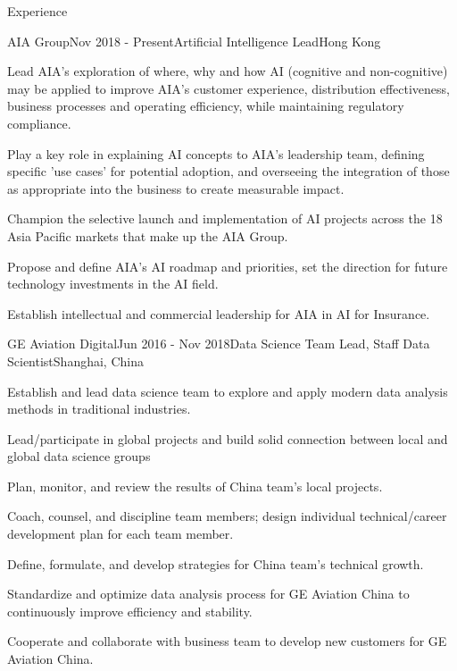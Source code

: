 \documentclass{resume} %
\begin{document}
\begin{rSection}{Experience}

\begin{rSubsection}{AIA Group}{Nov 2018 - Present}{Artificial Intelligence Lead}{Hong Kong}
\item Lead AIA's exploration of where, why and how AI (cognitive and non-cognitive) may be applied to improve AIA's customer experience, distribution effectiveness, business processes and operating efficiency, while maintaining regulatory compliance.
\item Play a key role in explaining AI concepts to AIA's leadership team, defining specific 'use cases' for potential adoption, and overseeing the integration of those as appropriate into the business to create measurable impact.
\item Champion the selective launch and implementation of AI projects across the 18 Asia Pacific markets that make up the AIA Group.
\item Propose and define AIA's AI roadmap and priorities, set the direction for future technology investments in the AI field.
\item Establish intellectual and commercial leadership for AIA in AI for Insurance.
\end{rSubsection}


\begin{rSubsection}{GE Aviation Digital}{Jun 2016 - Nov 2018}{Data Science Team Lead, Staff Data Scientist}{Shanghai, China}
\item Establish and lead data science team to explore and apply modern data analysis methods in traditional industries.
\item Lead/participate in global projects and build solid connection between local and global data science groups
\item Plan, monitor, and review the results of China team's local projects.
\item Coach, counsel, and discipline team members; design individual technical/career development plan for each team member.
\item Define, formulate, and develop strategies for China team's technical growth.
\item Standardize and optimize data analysis process for GE Aviation China to continuously improve efficiency and stability.
\item Cooperate and collaborate with business team to develop new customers for GE Aviation China.
\end{rSubsection}


\end{rSection}
\end{document}
